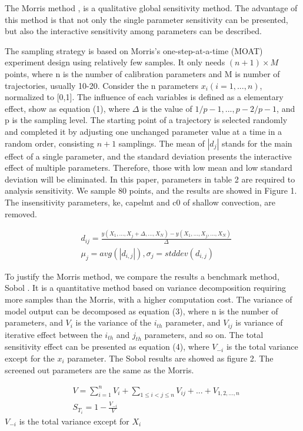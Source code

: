 \documentclass[gmd, manuscript]{copernicus}
\begin{document}
The Morris method \citep{morris1991factorial,campolongo2007effective}, is a qualitative global sensitivity method. The advantage of this method is that not only the single parameter sensitivity can be presented, but also the interactive sensitivity among parameters can be described. 

The sampling strategy is based on Morris’s one-step-at-a-time (MOAT) experiment design using relatively few samples. It only needs  $(n+1) \times M$ points, where n is the number of calibration parameters and M is number of trajectories, usually 10-20. Consider the n parameters $x_i (i=1,...,n)$, normalized to [0,1]. The influence of each variables is defined as a elementary effect, show as equation (1), where $\Delta$ is the value of $1/p-1, ..., p-2/p-1$, and p is the sampling level. The starting point of a trajectory is selected randomly and completed it by adjusting one unchanged parameter value at a time in a random order, consisting $n+1$ samplings. The mean of $|d_j|$ stands for the main effect of a single parameter, and the standard deviation presents the interactive effect of multiple parameters. Therefore, those with low mean and low standard deviation will be eliminated. In this paper, parameters in table 2 are required to analysis sensitivity. We sample 80 points, and the results are showed in Figure 1. The insensitivity parameters, ke, capelmt and c0 of shallow convection, are removed.

\begin{align}
& d_{ij} = \frac{y(X_1,...,X_j+\Delta,...,X_N)-y(X_1,...,X_j,...,X_N)}{\Delta} \\
& \mu_j = avg(|d_{i,j}|), \sigma_j = stddev(d_{i,j}) 
\end{align}

To justify the Morris method, we compare the results a benchmark method, Sobol \citep{sobol2001global}. It is a quantitative method based on variance decomposition requiring more samples than the Morris, with a higher computation cost. The variance of model output can be decomposed as equation (3), where n is the number of parameters, and $V_i$ is the variance of the $i_{th}$ parameter, and $V_{ij}$ is variance of iterative effect between the $i_{th}$ and $j_{th}$ parameters, and so on. The total sensitivity effect can be presented as equation (4), where $V_{-i}$ is the total variance except for the $x_i$ parameter. The Sobol results are showed as figure 2.  The screened out parameters are the same as the Morris.

\begin{align}
& V = \sum_{i=1}^n V_i + \sum_{1 \leq i < j \leq n} V_{ij} + ... + V_{1,2,...,n}  \\
& S_{T_i} = 1 - \frac{V_{-i}}{V} 
\end{align}
$V_{-i}$ is the total variance except for $X_i$
\end{document}
